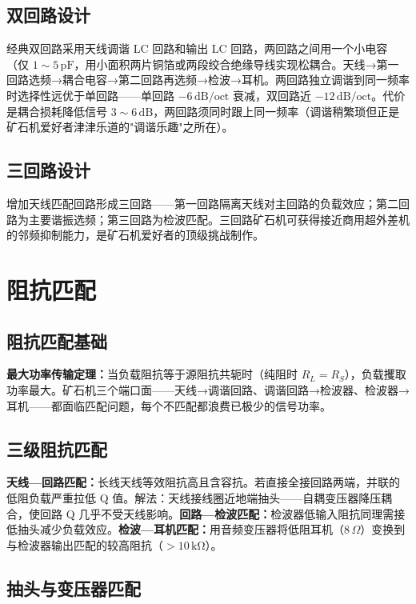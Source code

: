 \documentclass[12pt,UTF8]{ctexbook}
\begin{document}
\subsection{双回路设计}

经典双回路采用天线调谐 LC 回路和输出 LC 回路，两回路之间用一个小电容（仅 $1\sim5\,\mathrm{pF}$，用小面积两片铜箔或两段绞合绝缘导线实现松耦合。天线→第一回路选频→耦合电容→第二回路再选频→检波→耳机。两回路独立调谐到同一频率时选择性远优于单回路——单回路 $-6\,\mathrm{dB/oct}$ 衰减，双回路近 $-12\,\mathrm{dB/oct}$。代价是耦合损耗降低信号 $3\sim6\,\mathrm{dB}$，两回路须同时跟上同一频率（调谐稍繁琐但正是矿石机爱好者津津乐道的"调谐乐趣"之所在）。

\subsection{三回路设计}

增加天线匹配回路形成三回路——第一回路隔离天线对主回路的负载效应；第二回路为主要谐振选频；第三回路为检波匹配。三回路矿石机可获得接近商用超外差机的邻频抑制能力，是矿石机爱好者的顶级挑战制作。

\section{阻抗匹配}
\label{sec:crystal_impedance_matching}

\subsection{阻抗匹配基础}

\textbf{最大功率传输定理：}当负载阻抗等于源阻抗共轭时（纯阻时 $R_L=R_S$），负载攫取功率最大。矿石机三个端口面——天线→调谐回路、调谐回路→检波器、检波器→耳机——都面临匹配问题，每个不匹配都浪费已极少的信号功率。

\subsection{三级阻抗匹配}

\textbf{天线—回路匹配：}长线天线等效阻抗高且含容抗。若直接全接回路两端，并联的低阻负载严重拉低 Q 值。解法：天线接线圈近地端抽头——自耦变压器降压耦合，使回路 Q 几乎不受天线影响。\textbf{回路—检波匹配：}检波器低输入阻抗同理需接低抽头减少负载效应。\textbf{检波—耳机匹配：}用音频变压器将低阻耳机（$8\,\Omega$）变换到与检波器输出匹配的较高阻抗（$>10\,\mathrm{k\Omega}$）。

\subsection{抽头与变压器匹配}
\end{document}
